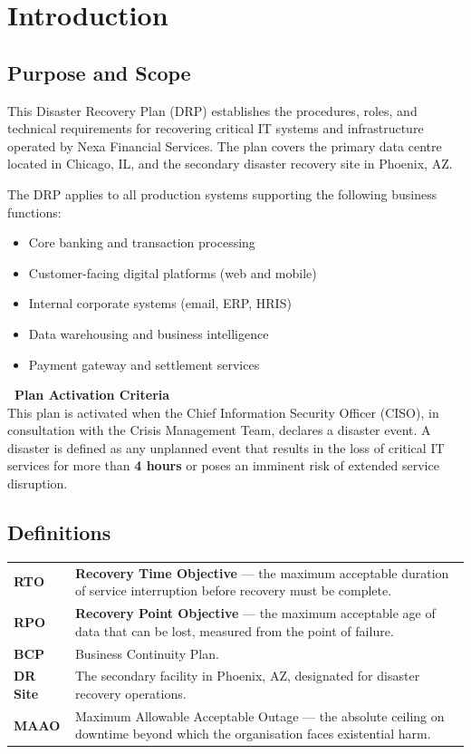\section{Introduction}

\subsection{Purpose and Scope}

This Disaster Recovery Plan (DRP) establishes the procedures, roles, and technical requirements for recovering critical IT systems and infrastructure operated by Nexa Financial Services. The plan covers the primary data centre located in Chicago, IL, and the secondary disaster recovery site in Phoenix, AZ.

The DRP applies to all production systems supporting the following business functions:
\begin{itemize}[nosep, leftmargin=*]
  \item Core banking and transaction processing
  \item Customer-facing digital platforms (web and mobile)
  \item Internal corporate systems (email, ERP, HRIS)
  \item Data warehousing and business intelligence
  \item Payment gateway and settlement services
\end{itemize}

\begin{infobox}
\textbf{\faInfoCircle\ Plan Activation Criteria}\\[4pt]
This plan is activated when the Chief Information Security Officer (CISO), in consultation with the Crisis Management Team, declares a disaster event. A disaster is defined as any unplanned event that results in the loss of critical IT services for more than \textbf{4 hours} or poses an imminent risk of extended service disruption.
\end{infobox}

\subsection{Definitions}

\begin{tabularx}{\textwidth}{@{}l X@{}}
  \textbf{RTO} & \textbf{Recovery Time Objective} --- the maximum acceptable duration of service interruption before recovery must be complete.\\
  \textbf{RPO} & \textbf{Recovery Point Objective} --- the maximum acceptable age of data that can be lost, measured from the point of failure.\\
  \textbf{BCP} & Business Continuity Plan.\\
  \textbf{DR Site} & The secondary facility in Phoenix, AZ, designated for disaster recovery operations.\\
  \textbf{MAAO} & Maximum Allowable Acceptable Outage --- the absolute ceiling on downtime beyond which the organisation faces existential harm.\\
\end{tabularx}

\clearpage

